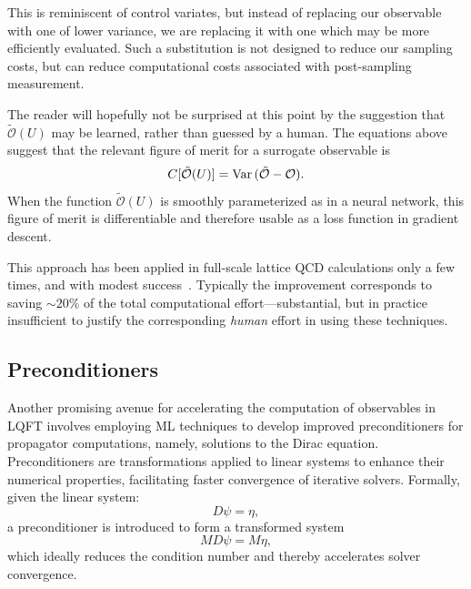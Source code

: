 \documentclass[12pt]{article}
\begin{document}
This is reminiscent of control variates, but instead of replacing our observable with one of lower variance, we are replacing it with one which may be more efficiently evaluated. Such a substitution is not designed to reduce our sampling costs, but can reduce computational costs associated with post-sampling measurement.

The reader will hopefully not be surprised at this point by the suggestion that $\tilde {\mathcal O}(U)$ may be learned, rather than guessed by a human. The equations above suggest that the relevant figure of merit for a surrogate observable is
\begin{equation}
    C[\tilde{\mathcal O}(U)] = \mathrm{Var}\,(\tilde{\mathcal O} - \mathcal O)
    \text.
\end{equation}
When the function $\tilde{\mathcal O}(U)$ is smoothly parameterized as in a neural network, this figure of merit is differentiable and therefore usable as a loss function in gradient descent.

This approach has been applied in full-scale lattice QCD calculations only a few times, and with modest success~\cite{Yoon:2018krb,Zhang:2019qiq}. Typically the improvement corresponds to saving $\sim 20\%$ of the total computational effort---substantial, but in practice insufficient to justify the corresponding \emph{human} effort in using these techniques.


\subsection{Preconditioners}

Another promising avenue for accelerating the computation of observables in LQFT involves employing ML techniques to develop improved preconditioners for propagator computations, namely, solutions to the Dirac equation. Preconditioners are transformations applied to linear systems to enhance their numerical properties, facilitating faster convergence of iterative solvers. Formally, given the linear system:
%
\begin{equation}
D\psi = \eta,
\end{equation}
%
a preconditioner  is introduced to form a transformed system
%
\begin{equation}
MD\psi = M\eta,
\end{equation}
%
which ideally reduces the condition number and thereby accelerates solver convergence.
\end{document}
